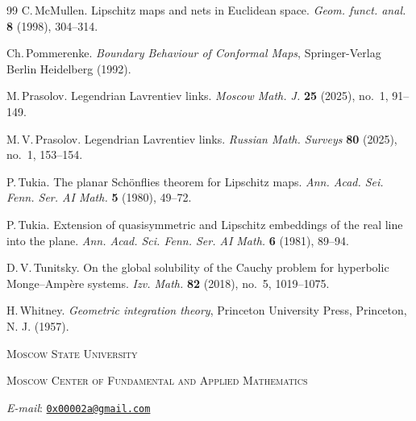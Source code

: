 \documentclass[12pt]{article}
\theoremstyle{definition}
\begin{document}
\begin{thebibliography}{99}
C.\,McMullen.
Lipschitz maps and nets in Euclidean space.
{\it Geom. funct. anal.} {\bf 8} (1998), 304--314.

Ch.\,Pommerenke.
\emph{Boundary Behaviour of Conformal Maps}, Springer-Verlag Berlin Heidelberg (1992).

M.\,Prasolov.
Legendrian Lavrentiev links.
\emph{Moscow Math. J.} {\bf 25} (2025), no.~1, 91--149.

M.\,V.\,Prasolov.
Legendrian Lavrentiev links.
{\it Russian Math. Surveys} {\bf 80} (2025), no.~1, 153--154.

P.\,Tukia.
The planar Sch\"onflies theorem for Lipschitz maps.
{\it Ann. Acad. Sei. Fenn. Ser. AI Math.} {\bf5} (1980), 49--72.

P.\,Tukia.
Extension of quasisymmetric and Lipschitz embeddings of the real line into the plane.
{\it Ann. Acad. Sci. Fenn. Ser. AI Math.} {\bf6} (1981), 89--94.

D.\,V.\,Tunitsky.
On the global solubility of the Cauchy problem for hyperbolic Monge–Amp\`ere systems.
{\it Izv. Math.} {\bf82} (2018), no.~5, 1019--1075.

H.\,Whitney.
\emph{Geometric integration theory}, Princeton University Press, Princeton, N. J. (1957).
\end{thebibliography}

\textsc{Moscow State University}

\textsc{Moscow Center of Fundamental and Applied Mathematics}

{\it E-mail}: \href{mailto: 0x00002a@gmail.com}{\texttt{0x00002a@gmail.com}}
\end{document}
